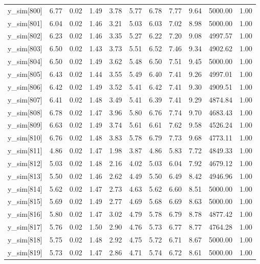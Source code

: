 \begin{table}[ht]
\begin{tabular}{rrrrrrrrrrr}
  y\_sim[800] & 6.77 & 0.02 & 1.49 & 3.78 & 5.77 & 6.78 & 7.77 & 9.64 & 5000.00 & 1.00 \\ 
  y\_sim[801] & 6.04 & 0.02 & 1.46 & 3.21 & 5.03 & 6.03 & 7.02 & 8.98 & 5000.00 & 1.00 \\ 
  y\_sim[802] & 6.23 & 0.02 & 1.46 & 3.35 & 5.27 & 6.22 & 7.20 & 9.08 & 4997.57 & 1.00 \\ 
  y\_sim[803] & 6.50 & 0.02 & 1.43 & 3.73 & 5.51 & 6.52 & 7.46 & 9.34 & 4902.62 & 1.00 \\ 
  y\_sim[804] & 6.50 & 0.02 & 1.49 & 3.62 & 5.48 & 6.50 & 7.51 & 9.45 & 5000.00 & 1.00 \\ 
  y\_sim[805] & 6.43 & 0.02 & 1.44 & 3.55 & 5.49 & 6.40 & 7.41 & 9.26 & 4997.01 & 1.00 \\ 
  y\_sim[806] & 6.42 & 0.02 & 1.49 & 3.52 & 5.41 & 6.42 & 7.41 & 9.30 & 4909.51 & 1.00 \\ 
  y\_sim[807] & 6.41 & 0.02 & 1.48 & 3.49 & 5.41 & 6.39 & 7.41 & 9.29 & 4874.84 & 1.00 \\ 
  y\_sim[808] & 6.78 & 0.02 & 1.47 & 3.96 & 5.80 & 6.76 & 7.74 & 9.70 & 4683.43 & 1.00 \\ 
  y\_sim[809] & 6.63 & 0.02 & 1.49 & 3.74 & 5.61 & 6.61 & 7.62 & 9.58 & 4526.24 & 1.00 \\ 
  y\_sim[810] & 6.76 & 0.02 & 1.48 & 3.83 & 5.78 & 6.79 & 7.73 & 9.68 & 4773.11 & 1.00 \\ 
  y\_sim[811] & 4.86 & 0.02 & 1.47 & 1.98 & 3.87 & 4.86 & 5.83 & 7.72 & 4849.33 & 1.00 \\ 
  y\_sim[812] & 5.03 & 0.02 & 1.48 & 2.16 & 4.02 & 5.03 & 6.04 & 7.92 & 4679.12 & 1.00 \\ 
  y\_sim[813] & 5.50 & 0.02 & 1.46 & 2.62 & 4.49 & 5.50 & 6.49 & 8.42 & 4946.96 & 1.00 \\ 
  y\_sim[814] & 5.62 & 0.02 & 1.47 & 2.73 & 4.63 & 5.62 & 6.60 & 8.51 & 5000.00 & 1.00 \\ 
  y\_sim[815] & 5.69 & 0.02 & 1.49 & 2.77 & 4.69 & 5.68 & 6.69 & 8.63 & 5000.00 & 1.00 \\ 
  y\_sim[816] & 5.80 & 0.02 & 1.47 & 3.02 & 4.79 & 5.78 & 6.79 & 8.78 & 4877.42 & 1.00 \\ 
  y\_sim[817] & 5.76 & 0.02 & 1.50 & 2.90 & 4.76 & 5.73 & 6.77 & 8.77 & 4764.28 & 1.00 \\ 
  y\_sim[818] & 5.75 & 0.02 & 1.48 & 2.92 & 4.75 & 5.72 & 6.71 & 8.67 & 5000.00 & 1.00 \\ 
  y\_sim[819] & 5.73 & 0.02 & 1.47 & 2.86 & 4.71 & 5.74 & 6.72 & 8.61 & 5000.00 & 1.00 \\ 

\end{tabular}
\end{table}
